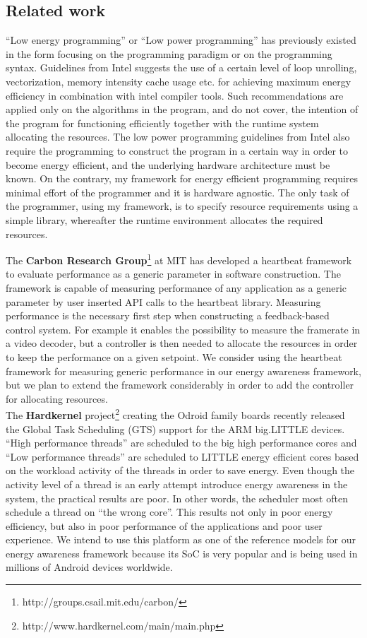 \documentclass{article}
\begin{document}
\subsection{Related work}
``Low energy programming'' or ``Low power programming'' has previously existed in the form focusing on the programming paradigm or on the programming syntax. 
Guidelines from Intel \cite{IntelLowPower} suggests the use of a certain level of loop unrolling, vectorization, memory intensity cache usage etc.
for achieving maximum energy efficiency in combination with intel compiler tools. 
Such recommendations are applied only on the algorithms in the program, and do not cover, the intention of the program for functioning efficiently together with the runtime system allocating the resources. 
The low power programming guidelines from Intel also require the programming to construct the program in a certain way in order to become energy efficient, 
and the underlying hardware architecture must be known. 
On the contrary, my framework for energy efficient programming requires minimal effort of the programmer and it is hardware agnostic. 
The only task of the programmer, using my framework, is to specify resource requirements using a simple library, whereafter the runtime environment allocates the required resources.

The \textbf{Carbon Research Group}\footnote{http://groups.csail.mit.edu/carbon/} at MIT has developed a heartbeat framework to evaluate performance as a generic parameter in software construction. The framework is capable of measuring performance of any application as a generic parameter by user inserted API calls to the heartbeat library. Measuring performance is the necessary first step when constructing a feedback-based control system. For example it enables the possibility to measure the framerate in a video decoder, but a controller is then needed to allocate the resources in order to keep the performance on a given setpoint. We consider using the heartbeat framework for measuring generic performance in our energy awareness framework, but we plan to extend the framework considerably in order to add the controller for allocating resources.\\

The \textbf{Hardkernel} project\footnote{http://www.hardkernel.com/main/main.php} creating the Odroid family boards recently released the Global Task Scheduling (GTS) support for the ARM big.LITTLE devices. “High performance threads” are scheduled to the big high performance cores and “Low performance threads” are scheduled to LITTLE energy efficient cores based on the workload activity of the threads in order to save energy. Even though the activity level of a thread is an early attempt introduce energy awareness in the system, the practical results are poor. In other words, the scheduler most often schedule a thread on “the wrong core”. This results not only in poor energy efficiency, but also in poor performance of the applications and poor user experience. We intend to use this platform as one of the reference models for our energy awareness framework because its SoC is very popular and is being used in millions of Android devices worldwide.\\
\end{document}
